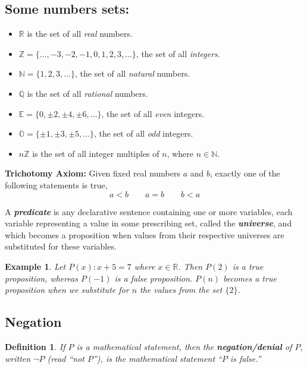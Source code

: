 \documentclass[10pt,reqno]{book}
\theoremstyle{plain}
\newtheorem{definition}[theorem]{Definition}
\newtheorem{example}{Example}
\def\R{\mathbb{R}}
\def\Z{\mathbb{Z}}
\def\Q{\mathbb{Q}}
\def\N{\mathbb{N}}
\def\E{\mathbb{E}}
\def\O{\mathbb{O}}
\begin{document}
	\subsection*{Some numbers sets:}
	\begin{itemize}
		\item $ \R $ is the set of all \textit{real} numbers.
		\item $ \Z = \{\dots,-3,-2,-1,0,1,2,3,\dots\} $, the set of all \textit{integers}.
		\item $ \N = \{ 1,2,3,\dots \} $, the set of all \textit{natural} numbers.
		\item $ \Q $ is the set of all \textit{rational} numbers.
		\item $ \E = \{ 0,\pm 2, \pm 4, \pm 6, \dots \} $, the set of all \textit{even} integers.
		\item $ \O = \{ \pm 1, \pm 3, \pm 5, \dots \} $, the set of all \textit{odd} integers.
		\item $ n\Z $ is the set of all integer multiples of $ n $, where $ n \in \N $.
	\end{itemize}
	
	\noindent \textbf{Trichotomy Axiom:} Given fixed real numbers $ a $ and $ b $, exactly one of the following statements is true,
	\[ a < b \qquad a = b \qquad b < a \]
	
	A \textbf{\textit{predicate}} is any declarative sentence containing one or more variables, each variable representing a value in some prescribing set, called the \textbf{\textit{universe}}, and which becomes a proposition when values from their respective universes are substituted for these variables.
	\begin{example}
		Let $ P(x): x + 5 = 7 $ where $ x \in \R $. Then $ P(2) $ is a true proposition, whereas $ P(-1) $ is a false proposition. $ P(n) $ becomes a true proposition when we substitute for $ n $ the values from the set $ \{2\} $.
	\end{example}
	
	\subsection*{Negation}
	
	\begin{definition}
		If $ P $ is a mathematical statement, then the \textbf{negation/denial} of $ P $, written $ \neg P $ (read ``not $ P $''), is the mathematical statement ``$ P $ is false.''
	\end{definition}
	
\end{document}

